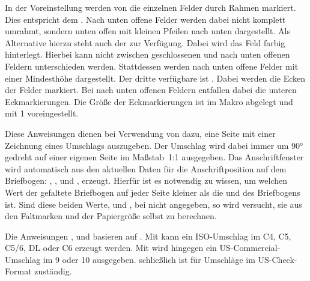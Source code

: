 \begin{Declaration}
\end{Declaration}
In der Voreinstellung werden von  die einzelnen Felder
durch Rahmen markiert. Dies entspricht dem
 . Nach unten offene Felder werden dabei nicht
komplett umrahmt, sondern unten offen mit kleinen Pfeilen nach unten
dargestellt. Als Alternative hierzu steht auch der
  zur Verfügung. Dabei wird das Feld farbig
hinterlegt. Hierbei kann nicht zwischen geschlossenen und nach unten offenen
Feldern unterschieden werden. Stattdessen werden nach unten offene Felder mit
einer Mindesthöhe dargestellt. Der dritte verfügbare
 ist . Dabei werden die Ecken der Felder
markiert. Bei nach unten offenen Feldern entfallen dabei die unteren
Eckmarkierungen. Die Größe der Eckmarkierungen ist im Makro 
abgelegt und mit 1 voreingestellt.%
\EndIndexGroup


\begin{Declaration}
\end{Declaration}
Diese Anweisungen dienen bei Verwendung von  dazu, eine
Seite mit einer Zeichnung eines Umschlags auszugeben. Der Umschlag wird dabei
immer um 90° gedreht auf einer eigenen Seite im Maßstab~1:1 ausgegeben. Das
Anschriftfenster wird automatisch aus den aktuellen Daten für die
Anschriftposition auf dem Briefbogen: ,
,  und ,
erzeugt. Hierfür ist es notwendig zu wissen, um welchen Wert der gefaltete
Briefbogen auf jeder Seite kleiner als die  und  des
Briefbogens ist. Sind diese beiden Werte,  und ,
bei  nicht angegeben, so wird versucht, sie aus den
Faltmarken und der Papiergröße selbst zu berechnen.

Die Anweisungen ,  und
 basieren auf . Mit
 kann ein ISO-Umschlag im  C4, C5, C5/6,
DL oder C6 erzeugt werden. Mit
 wird hingegen ein US-Commercial-Umschlag im
 9 oder 10 ausgegeben.  schließlich ist für
Umschläge im US-Check-Format zuständig.

